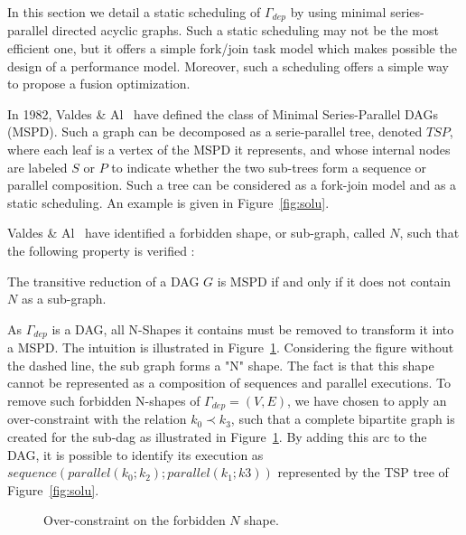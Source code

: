 In this section we detail a static scheduling of $\Gamma_{dep}$ by using minimal series-parallel directed acyclic graphs. Such a static scheduling may not be the most efficient one, but it offers a simple fork/join task model which makes possible the design of a performance model. Moreover, such a scheduling offers a simple way to propose a fusion optimization. 

In 1982, Valdes \& Al~\cite{Valdes:1979:RSP:800135.804393} have defined the class of Minimal Series-Parallel DAGs (MSPD). Such a graph can be decomposed as a serie-parallel tree, denoted $TSP$, where each leaf is a vertex of the MSPD it represents, and whose internal nodes are labeled $S$ or $P$ to indicate whether the two sub-trees form a sequence or parallel composition. Such a tree can be considered as a fork-join model and as a static scheduling. An example is given in Figure~\ref{fig:solu}.

Valdes \& Al~\cite{Valdes:1979:RSP:800135.804393} have identified a forbidden shape, or sub-graph, called $N$, such that the following property is verified :

\begin{myth}
The transitive reduction of a DAG $G$ is MSPD if and only if it does not contain $N$ as a sub-graph.
\end{myth}

As $\Gamma_{dep}$ is a DAG, all N-Shapes it contains must be removed to transform it into a MSPD. The intuition is illustrated in Figure~\ref{fig:over}. Considering the figure without the dashed line, the sub graph forms a "N" shape. The fact is that this shape cannot be represented as a composition of sequences and parallel executions.
To remove such forbidden N-shapes of $\Gamma_{dep}=(V,E)$, we have chosen to apply an over-constraint with the relation $k_0 \prec k_3$, such that a complete bipartite graph is created for the sub-dag as illustrated in Figure~\ref{fig:over}. By adding this arc to the DAG, it is possible to identify its execution as $sequence(parallel(k_0;k_2);parallel(k_1;k3))$ represented by the TSP tree of Figure~\ref{fig:solu}.

\begin{figure}[h!]
\begin{center}
\caption{Over-constraint on the forbidden $N$ shape.}
\label{fig:over}
\end{center}
\end{figure}

